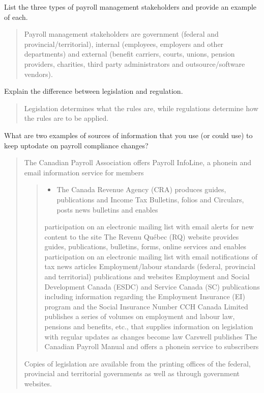 \documentclass[letterpaper,10pt,english]{sphinxmanual}
\begin{document}
\sphinxAtStartPar
List the three types of payroll management stakeholders and provide an example of each.
\begin{quote}

\sphinxAtStartPar
Payroll management stakeholders are government (federal and provincial/territorial), internal
(employees, employers and other departments) and external (benefit carriers, courts, unions, pension
providers, charities, third party administrators and outsource/software vendors).
\end{quote}

\sphinxAtStartPar
Explain the difference between legislation and regulation.
\begin{quote}

\sphinxAtStartPar
Legislation determines what the rules are, while regulations determine how the rules are to be applied.
\end{quote}

\sphinxAtStartPar
What are two examples of sources of information that you use (or could use) to keep upto\sphinxhyphen{}date on payroll compliance changes?
\begin{quote}

\sphinxAtStartPar
The Canadian Payroll Association offers Payroll InfoLine, a phone\sphinxhyphen{}in and e\sphinxhyphen{}mail information service for members
\begin{quote}
\begin{itemize}
\item {} 
\sphinxAtStartPar
The Canada Revenue Agency (CRA) produces guides, publications and Income Tax Bulletins, folios and Circulars, posts news bulletins and enables

\end{itemize}

\sphinxAtStartPar
participation on an electronic mailing list with e\sphinxhyphen{}mail alerts for new content to the site
\sphinxhyphen{} The Revenu Québec (RQ) website provides guides, publications, bulletins, forms, online services and enables participation on an electronic mailing list with e\sphinxhyphen{}mail notifications of tax news articles
\sphinxhyphen{} Employment/labour standards (federal, provincial and territorial) publications and websites
\sphinxhyphen{} Employment and Social Development Canada (ESDC) and Service Canada (SC) publications including information regarding the Employment Insurance (EI) program and the Social Insurance Number
\sphinxhyphen{} CCH Canada Limited publishes a series of volumes on employment and labour law, pensions and benefits, etc., that supplies information on legislation with regular updates as changes become law
\sphinxhyphen{} Carswell publishes The Canadian Payroll Manual and offers a phone\sphinxhyphen{}in service to subscribers
\end{quote}

\sphinxAtStartPar
Copies of legislation are available from the printing offices of the federal, provincial and territorial governments as well as through government websites.
\end{quote}
\end{document}
